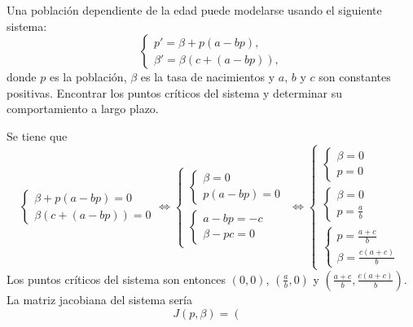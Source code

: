 \documentclass[11pt]{report}
\begin{document}
\begin{exercise}
    Una población dependiente de la edad puede modelarse usando el siguiente sistema:
    \[\begin{cases}
        p' = \beta+p(a-bp), \\
        \beta' =\beta(c+(a-bp)),
    \end{cases}\]
    donde $p$ es la población, $\beta$ es la tasa de nacimientos y $a$, $b$ y $c$ son constantes positivas. Encontrar los puntos críticos del sistema y determinar su comportamiento a largo plazo.
\end{exercise}

\begin{solution}
    Se tiene que
    \[\begin{cases}
        \beta+p(a-bp) = 0 \\
        \beta(c+(a-bp)) = 0
    \end{cases}\iff \begin{cases}
        \begin{cases}
            \beta = 0 \\
            p(a-bp) = 0
        \end{cases} \\[20pt]
        \begin{cases}
            a-bp = -c \\
            \beta-pc = 0
        \end{cases}
    \end{cases} \iff \begin{cases}
        \begin{cases}
            \beta = 0 \\
            p = 0
        \end{cases} \\[20pt]
        \begin{cases}
            \beta = 0 \\
            p = \frac{a}{b}
        \end{cases} \\[20pt]
        \begin{cases}
            p = \frac{a+c}{b} \\
            \beta = \frac{c(a+c)}{b}
        \end{cases}
    \end{cases}\]
    Los puntos críticos del sistema son entonces $(0,0)$, $(\frac{a}{b},0)$ y $(\frac{a+c}{b},\frac{c(a+c)}{b})$. La matriz jacobiana del sistema sería
    \[J(p,\beta) = \left(\begin{array}{cc}

\end{array}\]
\end{solution}
\end{document}
